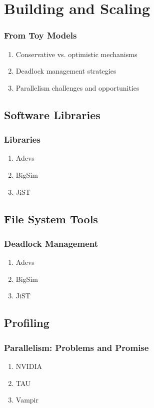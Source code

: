 % 

\section{Building and Scaling}
%
\begin{frame}\frametitle{From Toy Models}
\begin{enumerate}
	\item Conservative vs. optimistic mechanisms
	\item Deadlock management strategies
	\item Parallelism challenges and opportunities
\end{enumerate}
\end{frame}

\subsection{Software Libraries}
\begin{frame}\frametitle{Libraries}
\begin{enumerate}
	\item Adevs 
	\item BigSim
	\item JiST
\end{enumerate}
\end{frame}

\subsection{File System Tools}
\begin{frame}\frametitle{Deadlock Management}
\begin{enumerate}
	\item Adevs 
	\item BigSim
	\item JiST
\end{enumerate}
\end{frame}

\subsection{Profiling}
\begin{frame}\frametitle{Parallelism: Problems and Promise}
\begin{enumerate}
	\item NVIDIA 
	\item TAU
	\item Vampir
\end{enumerate}
\end{frame}

\endinput  %
